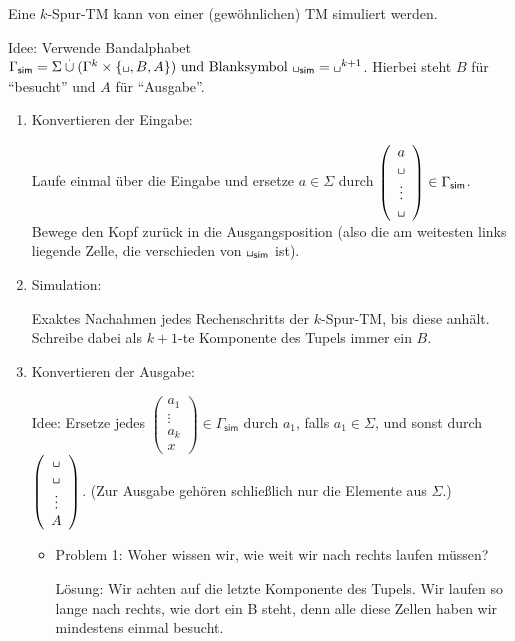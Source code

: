 \begin{Bemerkung}
Eine $k$-Spur-\ac{TM} kann von einer (gewöhnlichen) \ac{TM} simuliert werden.

\medskip

Idee: Verwende Bandalphabet $\Gamma_\mathsf{sim} = \Sigma \overset{.}{\cup} (\Gamma^k\times\{\blank, B, A\})\text{ und Blanksymbol } \blank_\mathsf{sim}=\blank^{k+1}$.
Hierbei steht $B$ für "`besucht"' und $A$ für "`Ausgabe"'.

\begin{enumerate}
 \item Konvertieren der Eingabe:
 
 Laufe einmal über die Eingabe und ersetze $a\in\Sigma$ durch $\left(\begin{array}{c}a\\ \mblank\\ \vdots\\ \mblank\end{array}\right)\in\Gamma_\mathsf{sim}$.
 Bewege den Kopf zurück in die Ausgangsposition (also die am weitesten links liegende Zelle, die verschieden von $\blank_\mathsf{sim}$ ist).
 
 \item Simulation:
 
 Exaktes Nachahmen jedes Rechenschritts der $k$-Spur-\ac{TM}, bis diese anhält.
 Schreibe dabei als $k+1$-te Komponente des Tupels immer ein $B$.
 
 \item Konvertieren der Ausgabe:
 
 Idee: Ersetze jedes $\left(\begin{array}{c}a_1\\ \vdots\\ a_k\\ x\end{array}\right)\in\Gamma_\mathsf{sim}$ durch $a_1$, falls $a_1\in\Sigma$, und sonst durch
 $\left(\begin{array}{c}\mblank \\ \mblank\\ \vdots\\ A\end{array}\right)$.
 (Zur Ausgabe gehören schließlich nur die Elemente aus $\Sigma$.)
 
 \begin{itemize}
  \item Problem 1: Woher wissen wir, wie weit wir nach rechts laufen müssen?
  
  Lösung: Wir achten auf die letzte Komponente des Tupels. 
  Wir laufen so lange nach rechts, wie dort ein B steht, denn alle diese Zellen haben wir mindestens einmal besucht.
  

\end{itemize}
\end{enumerate}
\end{Bemerkung}
